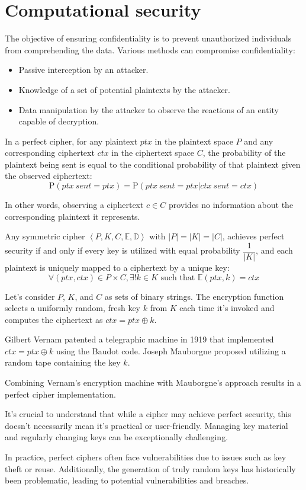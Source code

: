 \section{Computational security}

The objective of ensuring confidentiality is to prevent unauthorized individuals from comprehending the data. 
Various methods can compromise confidentiality:
\begin{itemize}
    \item Passive interception by an attacker.
    \item Knowledge of a set of potential plaintexts by the attacker.
    \item Data manipulation by the attacker to observe the reactions of an entity capable of decryption.
\end{itemize}

\begin{definition}
    In a perfect cipher, for any plaintext $ptx$ in the plaintext space $P$ and any corresponding ciphertext $ctx$ in the ciphertext space $C$, the probability of the plaintext being sent is equal to the conditional probability of that plaintext given the observed ciphertext:
    \[\text{P}(ptx\:sent=ptx)=\text{P}(ptx\:sent=ptx|ctx\:sent=ctx)\]
\end{definition}
In other words, observing a ciphertext $c \in C$ provides no information about the corresponding plaintext it represents.
\begin{theorem}[Shannon 1949]
    Any symmetric cipher $\left\langle P,K,C,\mathbb{E},\mathbb{D} \right\rangle $ with $\left\lvert P \right\rvert=\left\lvert K \right\rvert=\left\lvert C \right\rvert$, achieves perfect security if and only if every key is utilized with equal probability $\dfrac{1}{\left\lvert K\right\rvert }$, and each plaintext is uniquely mapped to a ciphertext by a unique key:
    \[\forall \left(ptx,ctx\right) \in P \times C, \exists !k \in K \text{ such that } \mathbb{E}\left(ptx,k\right)=ctx\]
\end{theorem}
\begin{example}
    Let's consider $P$, $K$, and $C$ as sets of binary strings. 
    The encryption function selects a uniformly random, fresh key $k$ from $K$ each time it's invoked and computes the ciphertext as $ctx=ptx \oplus k$.

    Gilbert Vernam patented a telegraphic machine in 1919 that implemented $ctx=ptx \oplus k$ using the Baudot code. 
    Joseph Mauborgne proposed utilizing a random tape containing the key $k$.

    Combining Vernam's encryption machine with Mauborgne's approach results in a perfect cipher implementation.
\end{example}

It's crucial to understand that while a cipher may achieve perfect security, this doesn't necessarily mean it's practical or user-friendly.
Managing key material and regularly changing keys can be exceptionally challenging.

In practice, perfect ciphers often face vulnerabilities due to issues such as key theft or reuse. 
Additionally, the generation of truly random keys has historically been problematic, leading to potential vulnerabilities and breaches.